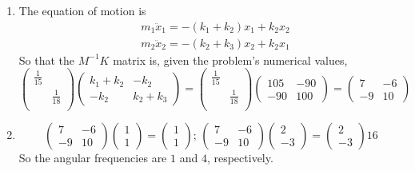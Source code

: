 \documentclass[twoside,10pt]{amsart}
\newcommand{\problemhead}[1]
  {\smallskip
   \noindent{\large\bf Problem #1.}
   \smallskip}
\begin{document}
\problemhead{3.5} 
\begin{enumerate}
  \item The equation of motion is 
\[
\begin{aligned}
  & m_1 \ddot{x}_1 = -(k_1 +k_2) x_1 + k_2 x_2  \\
  & m_2 \ddot{x}_2 = -(k_2 +k_3) x_2 + k_2 x_1 
\end{aligned}
\]
So that the $M^{-1}K$ matrix is, given the problem's numerical values,
\[
\left( 
\begin{matrix} 
  \frac{1}{15} &  \\
  & \frac{1}{18} \\
\end{matrix} 
\right)
\left( 
\begin{matrix}
  k_1 +k_2 & -k_2 \\
  -k_2 & k_2 + k_3 
\end{matrix}
\right) = \left( 
\begin{matrix} 
  \frac{1}{15} &  \\
  & \frac{1}{18} \\
\end{matrix} 
\right) \left( \begin{matrix} 105 & -90 \\ -90 & 100 \end{matrix} \right) = \left( \begin{matrix} 7 & -6 \\ -9 & 10 \end{matrix} \right) 
\]
\item 
\[
\left( \begin{matrix} 7 & -6 \\ -9 & 10 \end{matrix} \right) \left( \begin{matrix} 1 \\ 1 \end{matrix} \right) = \left( \begin{matrix} 1 \\ 1 \end{matrix} \right) ; \, \left( \begin{matrix} 7 & -6 \\ -9 & 10 \end{matrix} \right) \left( \begin{matrix} 2 \\ -3 \end{matrix} \right) = \left( \begin{matrix} 2 \\ -3 \end{matrix} \right) 16
\]
So the angular frequencies are $1$ and $4$, respectively.
\end{enumerate} 
\end{document}
